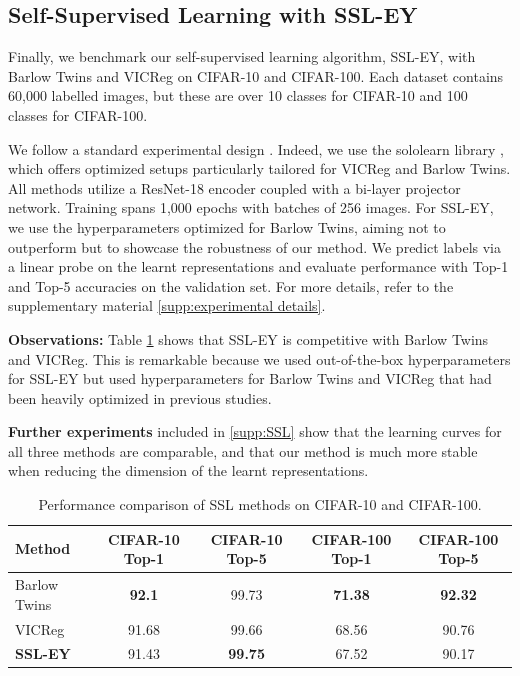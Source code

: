 \subsection{Self-Supervised Learning with SSL-EY}
Finally, we benchmark our self-supervised learning algorithm, SSL-EY, with Barlow Twins and VICReg on CIFAR-10 and CIFAR-100. Each dataset contains 60,000 labelled images, but these are over 10 classes for CIFAR-10 and 100 classes for CIFAR-100.

We follow a standard experimental design \citep{tong2023emp}. Indeed, we use the sololearn library \citep{da2022solo}, which offers optimized setups particularly tailored for VICReg and Barlow Twins. All methods utilize a ResNet-18 encoder coupled with a bi-layer projector network. Training spans 1,000 epochs with batches of 256 images. For SSL-EY, we use the hyperparameters optimized for Barlow Twins, aiming not to outperform but to showcase the robustness of our method.
We predict labels via a linear probe on the learnt representations and evaluate performance with Top-1 and Top-5 accuracies on the validation set. For more details, refer to the supplementary material \ref{supp:experimental details}.

\textbf{Observations:} Table \ref{tab:selfsup} shows that SSL-EY is competitive with Barlow Twins and VICReg. This is remarkable because we used out-of-the-box hyperparameters for SSL-EY but used hyperparameters for Barlow Twins and VICReg that had been heavily optimized in previous studies.

\textbf{Further experiments} included in \cref{supp:SSL} show that the learning curves for all three methods are comparable, and that our method is much more stable when reducing the dimension of the learnt representations.

\begin{table}
    \centering
    \begin{tabular}{lcccc}
        \hline
        Method & CIFAR-10 Top-1 & CIFAR-10 Top-5 & CIFAR-100 Top-1 & CIFAR-100 Top-5 \\
        \hline
        Barlow Twins & \textbf{92.1} & 99.73 & \textbf{71.38} & \textbf{92.32} \\
        VICReg & 91.68 & 99.66 & 68.56 & 90.76 \\
        \textbf{SSL-EY} & 91.43 & \textbf{99.75} & 67.52 & 90.17 \\
        \hline
    \end{tabular}
    \caption{Performance comparison of SSL methods on CIFAR-10 and CIFAR-100.}
    \label{tab:selfsup}
\end{table}


